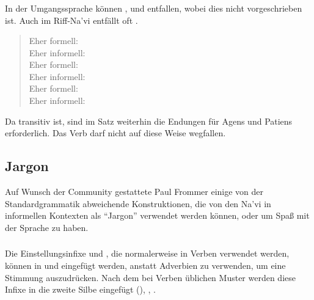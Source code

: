 \subsubsection{} \label{prag:colloq:omit}
In der Umgangssprache können ,  und  entfallen, wobei dies nicht vorgeschrieben ist. Auch im Riff-Na'vi entfällt oft . 

\begin{quotation}
\noindent Eher formell:  \\
\noindent Eher informell:  \\

\noindent Eher formell:  \\
\noindent Eher informell:  \\

\noindent Eher formell:  \\
\noindent Eher informell:  
\end{quotation}

\noindent Da  transitiv ist, sind im Satz  weiterhin die Endungen für Agens und Patiens erforderlich. Das Verb   darf nicht auf diese Weise wegfallen.

\subsection{Jargon} Auf Wunsch der Community gestattete Paul Frommer einige von der Standardgrammatik abweichende Konstruktionen, die von den Na'vi in informellen Kontexten als ``Jargon'' verwendet werden können, oder um Spaß mit der Sprache zu haben.

\subsubsection{}Die Einstellungsinfixe  und , die normalerweise in Verben verwendet werden, können in   und   eingefügt werden, anstatt Adverbien zu verwenden, um eine Stimmung auszudrücken. Nach dem bei Verben üblichen Muster werden diese Infixe in die zweite Silbe eingefügt (), , .

